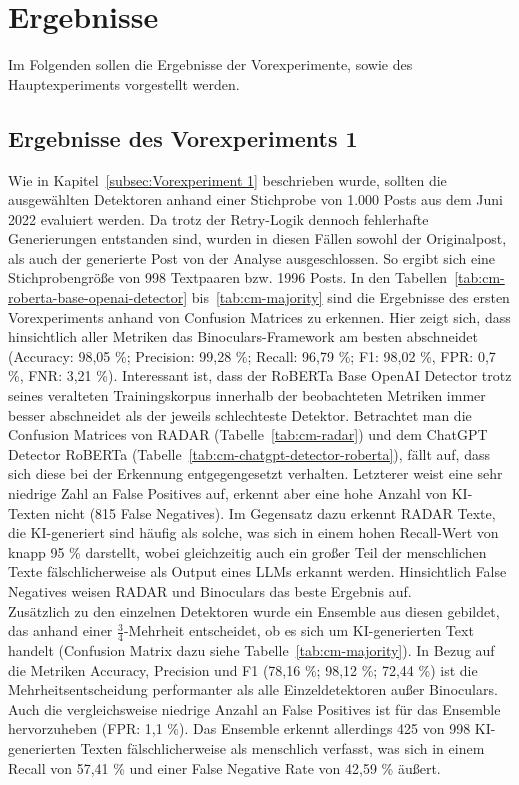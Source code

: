 \chapter{Ergebnisse}
\label{chap:results}
Im Folgenden sollen die Ergebnisse der Vorexperimente, sowie des Hauptexperiments vorgestellt werden.

\section{Ergebnisse des Vorexperiments 1}
\label{sec:ergebnisse_vorexperiment1}
Wie in Kapitel~\ref{subsec:Vorexperiment 1} beschrieben wurde, sollten die ausgewählten Detektoren anhand einer Stichprobe von 1.000 Posts aus dem Juni 2022 evaluiert werden. Da trotz der Retry-Logik dennoch fehlerhafte Generierungen entstanden sind, wurden in diesen Fällen sowohl der Originalpost, als auch der generierte Post von der Analyse ausgeschlossen. So ergibt sich eine Stichprobengröße von 998 Textpaaren bzw. 1996 Posts.
In den Tabellen~\ref{tab:cm-roberta-base-openai-detector} bis~\ref{tab:cm-majority} sind die Ergebnisse des ersten Vorexperiments anhand von Confusion Matrices zu erkennen. Hier zeigt sich, dass hinsichtlich aller Metriken das Binoculars-Framework am besten abschneidet (Accuracy: 98,05 \%; Precision: 99,28 \%; Recall: 96,79 \%; F1: 98,02 \%, FPR: 0,7 \%, FNR: 3,21 \%). Interessant ist, dass der RoBERTa Base OpenAI Detector trotz seines veralteten Trainingskorpus innerhalb der beobachteten Metriken immer besser abschneidet als der jeweils schlechteste Detektor. Betrachtet man die Confusion Matrices von RADAR (Tabelle~\ref{tab:cm-radar}) und dem ChatGPT Detector RoBERTa (Tabelle~\ref{tab:cm-chatgpt-detector-roberta}), fällt auf, dass sich diese bei der Erkennung entgegengesetzt verhalten. Letzterer weist eine sehr niedrige Zahl an False Positives auf, erkennt aber eine hohe Anzahl von KI-Texten nicht (815 False Negatives). Im Gegensatz dazu erkennt RADAR Texte, die KI-generiert sind häufig als solche, was sich in einem hohen Recall-Wert von knapp 95 \% darstellt, wobei gleichzeitig auch ein großer Teil der menschlichen Texte fälschlicherweise als Output eines LLMs erkannt werden. Hinsichtlich False Negatives weisen RADAR und Binoculars das beste Ergebnis auf. \\
Zusätzlich zu den einzelnen Detektoren wurde ein Ensemble aus diesen gebildet, das anhand einer \(\frac{3}{4}\)-Mehrheit entscheidet, ob es sich um KI-generierten Text handelt (Confusion Matrix dazu siehe Tabelle~\ref{tab:cm-majority}). In Bezug auf die Metriken Accuracy, Precision und F1 (78,16 \%; 98,12 \%; 72,44 \%) ist die Mehrheitsentscheidung performanter als alle Einzeldetektoren außer Binoculars. Auch die vergleichsweise niedrige Anzahl an False Positives ist für das Ensemble hervorzuheben (FPR: 1,1 \%). Das Ensemble erkennt allerdings 425 von 998 KI-generierten Texten fälschlicherweise als menschlich verfasst, was sich in einem Recall von 57,41 \% und einer False Negative Rate von 42,59 \% äußert.


